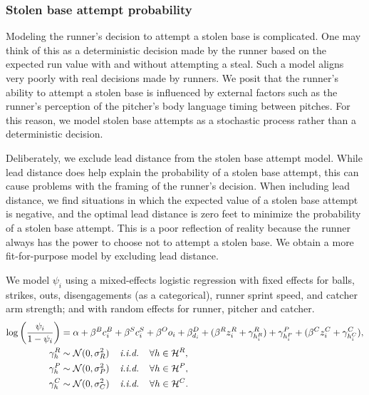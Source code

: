 \documentclass{article}
\begin{document}
      \subsubsection{Stolen base attempt probability}
      \label{sec:prob-sb-attempt}

        Modeling the runner's decision to attempt a stolen base is complicated. One may think of this as a deterministic decision made by the runner based on the expected run value with and without attempting a steal. Such a model aligns very poorly with real decisions made by runners. We posit that the runner's ability to attempt a stolen base is influenced by external factors such as the runner's perception of the pitcher's body language timing between pitches. For this reason, we model stolen base attempts as a stochastic process rather than a deterministic decision.

        Deliberately, we exclude lead distance from the stolen base attempt model. While lead distance does help explain the probability of a stolen base attempt, this can cause problems with the framing of the runner's decision. When including lead distance, we find situations in which the expected value of a stolen base attempt is negative, and the optimal lead distance is zero feet to minimize the probability of a stolen base attempt. This is a poor reflection of reality because the runner always has the power to choose not to attempt a stolen base. We obtain a more fit-for-purpose model by excluding lead distance.

        We model $\psi_i$ using a mixed-effects logistic regression with fixed effects for balls, strikes, outs, disengagements (as a categorical), runner sprint speed, and catcher arm strength; and with random effects for runner, pitcher and catcher.
        \begin{align}
          \label{eqn:prob-sb-attempt}
          \begin{split}
            \log\left(\frac{\psi_i}{1 - \psi_i}\right) &= \alpha + \beta^B c_i^B + \beta^S c_i^S + \beta^O o_i + \beta^D_{d_i} + (\beta^R z_i^R + \gamma^R_{h_i^R}) + \gamma^P_{h_i^P} + (\beta^C z_i^C + \gamma^C_{h_i^C}),\\
            \gamma^R_{h} &\sim \mathcal{N}(0, \sigma^2_R) \hspace{4mm} \mbox{\it i.i.d.} \hspace{4mm} \forall h \in \mathcal{H}^R,\\
            \gamma^P_{h} &\sim \mathcal{N}(0, \sigma^2_P) \hspace{4mm} \mbox{\it i.i.d.} \hspace{4mm} \forall h \in \mathcal{H}^P,\\
            \gamma^C_{h} &\sim \mathcal{N}(0, \sigma^2_C) \hspace{4mm} \mbox{\it i.i.d.} \hspace{4mm} \forall h \in \mathcal{H}^C.
          \end{split}
        \end{align}
 
\end{document}

